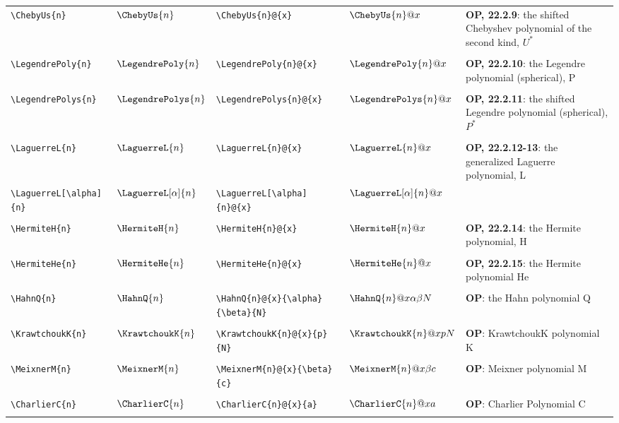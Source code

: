 \begin{supertabular}{ll|ll|p{2in}}
\verb~\ChebyUs{n}~ & $\ChebyUs{n}$ & 
\verb~\ChebyUs{n}@{x}~ & $\ChebyUs{n}@{x}$ & 
\textbf{OP, 22.2.9}: the shifted Chebyshev polynomial of the second kind, $U^*$\\*
&&&&\\[-1ex]
\verb~\LegendrePoly{n}~ & $\LegendrePoly{n}$ & 
\verb~\LegendrePoly{n}@{x}~ & $\LegendrePoly{n}@{x}$ & 
\textbf{OP, 22.2.10}: the Legendre polynomial (spherical), P\\*
&&&&\\[-1ex]
\verb~\LegendrePolys{n}~ & $\LegendrePolys{n}$ & 
\verb~\LegendrePolys{n}@{x}~ & $\LegendrePolys{n}@{x}$ & 
\textbf{OP, 22.2.11}: the shifted Legendre polynomial (spherical), $P^*$\\*
&&&&\\[-1ex]
\verb~\LaguerreL{n}~ & $\LaguerreL{n}$ & 
\verb~\LaguerreL{n}@{x}~ & $\LaguerreL{n}@{x}$ & 
\textbf{OP, 22.2.12-13}: the generalized Laguerre polynomial, L\\*
\verb~\LaguerreL[\alpha]{n}~ & $\LaguerreL[\alpha]{n}$ & 
\verb~\LaguerreL[\alpha]{n}@{x}~ & $\LaguerreL[\alpha]{n}@{x}$ & 
\\*
&&&&\\[-1ex]
\verb~\HermiteH{n}~ & $\HermiteH{n}$ & 
\verb~\HermiteH{n}@{x}~ & $\HermiteH{n}@{x}$ & 
\textbf{OP, 22.2.14}: the Hermite polynomial, H\\*
&&&&\\[-1ex]
\verb~\HermiteHe{n}~ & $\HermiteHe{n}$ & 
\verb~\HermiteHe{n}@{x}~ & $\HermiteHe{n}@{x}$ & 
\textbf{OP, 22.2.15}: the Hermite polynomial He\\*
&&&&\\[-1ex]
\verb~\HahnQ{n}~ & $\HahnQ{n}$ & 
\verb~\HahnQ{n}@{x}{\alpha}{\beta}{N}~ & $\HahnQ{n}@{x}{\alpha}{\beta}{N}$ & 
\textbf{OP}: the Hahn polynomial Q\\*
&&&&\\[-1ex]
\verb~\KrawtchoukK{n}~ & $\KrawtchoukK{n}$ & 
\verb~\KrawtchoukK{n}@{x}{p}{N}~ & $\KrawtchoukK{n}@{x}{p}{N}$ & 
\textbf{OP}: KrawtchoukK polynomial K\\*
&&&&\\[-1ex]
\verb~\MeixnerM{n}~ & $\MeixnerM{n}$ & 
\verb~\MeixnerM{n}@{x}{\beta}{c}~ & $\MeixnerM{n}@{x}{\beta}{c}$ & 
\textbf{OP}: Meixner polynomial M\\*
&&&&\\[-1ex]
\verb~\CharlierC{n}~ & $\CharlierC{n}$ & 
\verb~\CharlierC{n}@{x}{a}~ & $\CharlierC{n}@{x}{a}$ & 
\textbf{OP}: Charlier Polynomial C\\*
&&&&\\[-1ex]

\end{supertabular}
